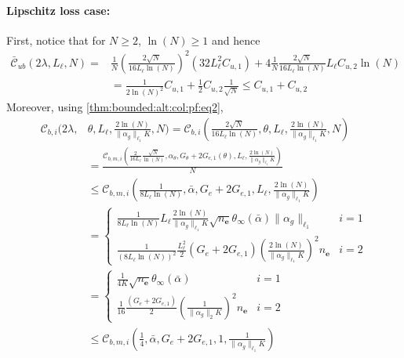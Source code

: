 \documentclass{article}
\newcommand{\e}{\mathbf{e}}
\begin{document}
      \paragraph{Lipschitz loss case:}
         First, notice that for $N \ge 2$, $\ln(N) \ge 1$ and hence  
         \begin{equation}
          \label{thm:bounded:alt:col:pf:eq3}
         \begin{aligned}
            \mathcal{\bar{C}}_{ub}(2\lambda,L_{\ell},N)= &\frac{1}{N}\left(\frac{2\sqrt{N}}{16 L_{\ell}\ln(N)} \right)^2 \left(32 L_{\ell}^2C_{u,1}\right)
            + 4\frac{1}{N} \frac{2\sqrt{N}}{16L_{\ell}\ln(N)} L_{\ell}C_{u,2} \ln(N) \\
            & = \frac{1}{2\ln(N)^2}C_{u,1}+\frac{1}{2} C_{u,2} \frac{1}{\sqrt{N}} \le C_{u,1}+C_{u,2}
         \end{aligned}
        \end{equation}
        Moreover, using \eqref{thm:bounded:alt:col:pf:eq2}, 
        \begin{equation}
          \label{thm:bounded:alt:col:pf:eq4}
         \begin{aligned}
           \mathcal{C}_{b,i}(2\lambda, & \theta,L_{\ell},\frac{2\ln(N)}{\|\alpha_g\|_{\ell_1}K},N)  =
           \mathcal{C}_{b,i}(\frac{2\sqrt{N}}{16L_{\ell}\ln(N)}, \theta,L_{\ell},\frac{2\ln(N)}{\|\alpha_g\|_{\ell_1}K},N)  \\
           &= \frac{\mathcal{C}_{b,m,i}(\frac{2}{16L_{\ell}}\frac{\sqrt{N}}{\ln(N)},\alpha_{\theta},G_{\theta}+2G_{e,1}(\theta),L_{\ell},\frac{2\ln(N)}{\|\alpha_g\|_{\ell_1}K})}{N} \\
           & \le \mathcal{C}_{b,m,i}(\frac{1}{8L_{\ell}\ln(N)},\bar{\alpha},G_e+2G_{e,1},L_{\ell}, \frac{2\ln(N)}{\|\alpha_g\|_{\ell_1}K}) \\
           & = \left\{ \begin{array}{ll}
             \frac{1}{8L_{\ell}\ln(N)} L_{\ell} \frac{2\ln(N)}{\|\alpha_g\|_{\ell_1}K} \sqrt{n_{\e}}\theta_\infty(\bar\alpha)\|\alpha_g\|_{\ell_1}  & i=1 \\
             \frac{1}{(8L_{\ell}\ln(N))^2} \frac{L_{\ell}^2}{2} (G_e+2G_{e,1}) \left(\frac{2\ln(N)}{\|\alpha_g\|_{\ell_1}K}\right)^2 n_{\e}  & i=2 \end{array} \right. \\
           & = \left\{ \begin{array}{ll}
             \frac{1}{4K} \sqrt{n_{\e}}\theta_\infty(\bar\alpha)& i=1 \\
             \frac{1}{16} \frac{(G_e+2G_{e,1})}{2} \left(\frac{1}{\|\alpha_g\|_2K}\right)^2 n_{\e} & i=2 \end{array} \right. \\
             & \le  \mathcal{C}_{b,m,i}(\frac{1}{4},\bar{\alpha}, G_e+2G_{e,1},1, \frac{1}{\|\alpha_g\|_{\ell_1}K})
         \end{aligned}
        \end{equation}
\end{document}
